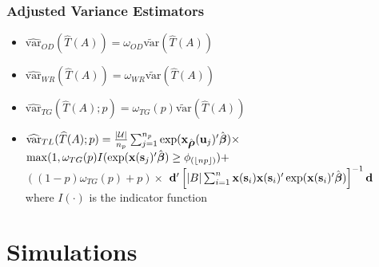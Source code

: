 \documentclass[mathserif,compress]{beamer}\usepackage{graphicx, color}
\def\bd{\mathbf{d}}
\def\bs{\mathbf{s}}
\def\bu{\mathbf{u}}
\def\bx{\mathbf{x}}
\def\cU{\mathcal{U}}
\def\bbeta{\mbox{\boldmath $\beta$}}
\def\brho{\mbox{\boldmath $\rho$}}
\def\var{\textrm{var}}
\def\upp{^\prime}
\def\upi{^{-1}}
\begin{document}
\begin{frame}[fragile]
\frametitle{Adjusted Variance Estimators}

	\begin{itemize}
	\item 
	$\widehat{\var}_{OD}(\widehat{T}(A)) = \omega_{OD}\widetilde{\var}(\widehat{T}(A))$
	\item 
	$\widehat{\var}_{WR}(\widehat{T}(A)) = \omega_{WR}\widetilde{\var}(\widehat{T}(A))$
	\item 
	$\widehat{\var}_{TG}(\widehat{T}(A);p) = \omega_{TG}(p)\widetilde{\var}(\widehat{T}(A))$
	\item 
$\widehat{\var}_{TL}(\widehat{T}(A);p) = \frac{|\cU|}{n_p}\sum_{j=1}^{n_p}\exp(\bx_{\hat{\brho}}(\bu_j)\upp\hat{\bbeta})\times$ $\max(1,\omega_{TG}(p)I(\exp(\bx(\bs_j)\upp \hat{\bbeta}) \ge \phi_{(\lfloor np \rfloor)}) + $ \\ $((1-p)\omega_{TG}(p) + p) \times$ $\bd\upp\left[ |B| \sum_{i=1}^{n} \bx(\bs_i)\bx({\bs_i})\upp\exp(\bx(\bs_i)\upp \hat{\bbeta}) \right]\upi\bd $ \\
where $I(\cdot)$ is the indicator function
	\end{itemize}

\end{frame}


\section{Simulations}
\end{document}

